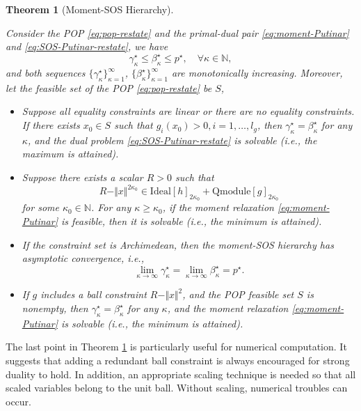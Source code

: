 \documentclass[
]{book}
\newtheorem{theorem}{Theorem}[chapter]
\theoremstyle{definition}
\theoremstyle{definition}
\theoremstyle{definition}
\theoremstyle{definition}
\theoremstyle{remark}
\begin{document}
\begin{theorem}[Moment-SOS Hierarchy]
\protect\hypertarget{thm:MomentSOSHierarchy}{}\label{thm:MomentSOSHierarchy}

Consider the POP \eqref{eq:pop-restate} and the primal-dual pair \eqref{eq:moment-Putinar} and \eqref{eq:SOS-Putinar-restate}, we have
\[
\gamma_{\kappa}^\star \leq \beta_{\kappa}^\star \leq p^\star, \quad \forall \kappa \in \mathbb{N},
\]
and both sequences \(\{ \gamma_{\kappa}^\star \}_{\kappa=1}^{\infty}\), \(\{ \beta_{\kappa}^\star \}_{\kappa=1}^{\infty}\) are monotonically increasing. Moreover, let the feasible set of the POP \eqref{eq:pop-restate} be \(S\),

\begin{itemize}
\item
  Suppose all equality constraints are linear or there are no equality constraints. If there exists \(x_0 \in S\) such that \(g_i(x_0) > 0, i=1,\dots,l_g\), then \(\gamma_{\kappa}^\star = \beta_{\kappa}^\star\) for any \(\kappa\), and the dual problem \eqref{eq:SOS-Putinar-restate} is solvable (i.e., the maximum is attained).
\item
  Suppose there exists a scalar \(R > 0\) such that
  \[
  R - \Vert x \Vert^{2\kappa_0} \in \mathrm{Ideal}[h]_{2\kappa_0} + \mathrm{Qmodule}[g]_{2\kappa_0}
  \]
  for some \(\kappa_0 \in \mathbb{N}\). For any \(\kappa \geq \kappa_0\), if the moment relaxation \eqref{eq:moment-Putinar} is feasible, then it is solvable (i.e., the minimum is attained).
\item
  If the constraint set is Archimedean, then the moment-SOS hierarchy has asymptotic convergence, i.e.,
  \[
  \lim_{\kappa \rightarrow \infty} \gamma_{\kappa}^\star = \lim_{\kappa \rightarrow \infty} \beta_{\kappa}^\star = p^\star.
  \]
\item
  If \(g\) includes a ball constraint \(R - \Vert x \Vert^2\), and the POP feasible set \(S\) is nonempty, then \(\gamma_{\kappa}^\star = \beta_{\kappa}^\star\) for any \(\kappa\), and the moment relaxation \eqref{eq:moment-Putinar} is solvable (i.e., the minimum is attained).
\end{itemize}

\end{theorem}

The last point in Theorem \ref{thm:MomentSOSHierarchy} is particularly useful for numerical computation. It suggests that adding a redundant ball constraint is always encouraged for strong duality to hold. In addition, an appropriate scaling technique is needed so that all scaled variables belong to the unit ball. Without scaling, numerical troubles can occur.
\end{document}
